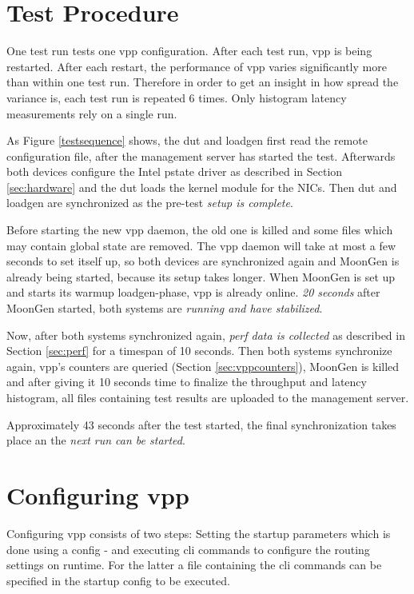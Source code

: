 \section{Test Procedure}

One test run tests one \Ac{vpp} configuration. After each test run,
\Ac{vpp} is being restarted. After each restart, the performance of
\Ac{vpp} varies significantly more than within one test run. Therefore
in order to get an insight in how spread the variance is, each test
run is repeated 6 times. Only histogram latency measurements rely on a
single run.

As Figure \ref{testsequence} shows, the \Ac{dut} and \Ac{loadgen}
first read the remote configuration file, after the management server
has started the test. Afterwards both devices configure the Intel
pstate driver  as described in Section \ref{sec:hardware} and the
\Ac{dut} loads the kernel module for the NICs. Then \Ac{dut} and
\Ac{loadgen} are synchronized as the pre-test \textit{setup is
complete}.

Before starting the new \Ac{vpp} daemon, the old one is killed and
some files which may contain global state are removed. The \Ac{vpp}
daemon will take at most a few seconds to set itself up, so both
devices are synchronized again and MoonGen is already being started,
because its setup takes longer. When MoonGen is set up and starts
its warmup \Ac{loadgen}-phase, \Ac{vpp} is already online. \textit{20
seconds} after MoonGen started, both systems are \textit{running and
have stabilized}.

Now, after both systems synchronized again, \textit{\Ac{perf} data is
collected} as described in Section \ref{sec:perf} for a timespan of 10
seconds. Then both systems synchronize again, \Ac{vpp}'s counters are
queried (Section \ref{sec:vppcounters}), MoonGen is killed and after
giving it 10 seconds time to finalize the throughput and latency
histogram, all files containing test results are uploaded to the
management server.

Approximately 43 seconds after the test started, the final
synchronization takes place an the \textit{next run can be started}.


\section{Configuring \Ac{vpp}}


Configuring \Ac{vpp} consists of two steps: Setting the startup
parameters which is done using a \Ac{config} - and executing \Ac{cli}
commands to configure the routing settings on runtime. For the latter
a file containing the \Ac{cli} commands can be specified in the
startup \Ac{config} to be executed. 

